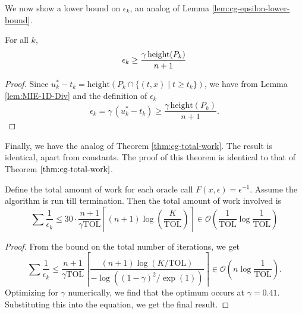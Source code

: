 We now show a lower bound on $\epsilon_k$, an analog of Lemma \ref{lem:cg-epsilon-lower-bound}.


\begin{lem}\label{lem:mie-epsilon-lower-bound}
For all $k$,
\[
\epsilon_k\geq \frac{\gamma \, \mbox{\rm height}(P_k)}{n+1}
\]
\end{lem}
\begin{proof}
Since $u^*_k - t_k = \mbox{height}(P_k \cap \{ (t,x) \mid t \geq t_k \})$, we have from Lemma \ref{lem:MIE-1D-Div} and the definition of $\epsilon_k$
\[
\epsilon_k = \gamma \, (u^*_k - t_k) 
\geq\frac{\gamma \, \mbox{height}(P_k)}{n+1}.
\]
\end{proof}

Finally, we have the analog of Theorem \ref{thm:cg-total-work}. The result is
identical, apart from constants. The proof of this theorem is identical to that of Theorem $\ref{thm:cg-total-work}$.

\begin{thm}
Define the total amount of work for each oracle call $F(x,\epsilon) = \epsilon^{-1}$. Assume the algorithm is run till termination. Then the total amount of work involved is
\[
\sum{\frac{1}{\epsilon_{k}}}\leq30\cdot\frac{n+1}{\gamma \mbox{TOL}}\left\lceil (n+1)\log\left(\frac{K}{\mbox{TOL}}\right)\right\rceil \in\mathcal{O}\left(\frac{1}{\mbox{TOL}}\log\frac{1}{\mbox{TOL}}\right)
\]
\end{thm}
\begin{proof} From the bound on the total number of iterations, we get
\[
\sum {\frac{1}{\epsilon_k}} 
\leq \frac{n+1}{\gamma\mbox{TOL}}
\left\lceil \frac{(n+1)\log(K/\mbox{TOL})}{-\log((1-\gamma)^2/\exp(1))} \right\rceil
\in \mathcal{O}\left(n\log\frac{1}{\mbox{TOL}}\right).
\]
Optimizing for $\gamma$ numerically, we find that the optimum occurs at $\gamma = 0.41$. Substituting this into the equation, we get the final result.
\end{proof}

